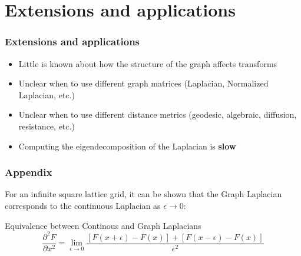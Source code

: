 \documentclass{beamer}
\begin{document}
\section{Extensions and applications}

\begin{frame}
  \frametitle{Extensions and applications}
  \begin{itemize}
    \item Little is known about how the structure of the graph affects transforms
    \item Unclear when to use different graph matrices (Laplacian, Normalized
      Laplacian, etc.)
    \item Unclear when to use different distance metrics (geodesic, algebraic,
      diffusion, resistance, etc.)
    \item Computing the eigendecomposition of the Laplacian is \textbf{slow}
  \end{itemize}
\end{frame}


\begin{frame}
\frametitle{Appendix}

For an infinite square lattice grid, it can be shown that the Graph Laplacian
corresponds to the continuous Laplacian as $\epsilon \rightarrow 0$:

  \begin{block}{Equivalence between Continous and Graph Laplacians}
    \begin{equation}
      \frac{\partial^2 F}{\partial x^2} = \lim_{\epsilon \rightarrow 0} \frac{[F(x + \epsilon) - F(x)] + [F(x - \epsilon) - F(x)]}{\epsilon^2}
    \end{equation}
  \end{block}

\end{frame}
\end{document}
